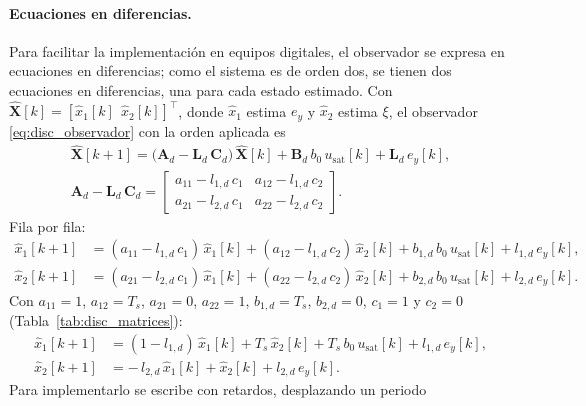 \paragraph{Ecuaciones en diferencias.} Para facilitar la implementación en equipos digitales, el
observador se expresa en ecuaciones en diferencias; como el sistema es de orden dos, se tienen dos
ecuaciones en diferencias, una para cada estado estimado. Con
$\widehat{\mathbf{X}}[k] = [\hat{x}_1[k]\ \ \hat{x}_2[k]]^{\top}$, donde
$\hat{x}_1$ estima $e_y$ y $\hat{x}_2$ estima $\xi$, el observador
\eqref{eq:disc_observador} con la orden aplicada es
\begin{equation}
\begin{gathered}
\widehat{\mathbf{X}}[k+1] = \bigl(\mathbf{A}_d - \mathbf{L}_d\,\mathbf{C}_d\bigr)\,\widehat{\mathbf{X}}[k]
+ \mathbf{B}_d\,b_0\,u_{\mathrm{sat}}[k] + \mathbf{L}_d\,e_y[k],
\\[6pt]
\mathbf{A}_d - \mathbf{L}_d\,\mathbf{C}_d =
\begin{bmatrix} a_{11} - l_{1,d}\,c_1 & a_{12} - l_{1,d}\,c_2 \\ a_{21} - l_{2,d}\,c_1 & a_{22} - l_{2,d}\,c_2 \end{bmatrix} .
\end{gathered}
\end{equation}
Fila por fila:
\begin{equation}
\begin{aligned}
\hat{x}_1[k+1] &= (a_{11} - l_{1,d}\,c_1)\,\hat{x}_1[k] + (a_{12} - l_{1,d}\,c_2)\,\hat{x}_2[k] + b_{1,d}\,b_0\,u_{\mathrm{sat}}[k] + l_{1,d}\,e_y[k], \\[2pt]
\hat{x}_2[k+1] &= (a_{21} - l_{2,d}\,c_1)\,\hat{x}_1[k] + (a_{22} - l_{2,d}\,c_2)\,\hat{x}_2[k] + b_{2,d}\,b_0\,u_{\mathrm{sat}}[k] + l_{2,d}\,e_y[k] .
\end{aligned}
\end{equation}
Con $a_{11} = 1$, $a_{12} = T_s$, $a_{21} = 0$, $a_{22} = 1$, $b_{1,d} = T_s$,
$b_{2,d} = 0$, $c_1 = 1$ y $c_2 = 0$ (Tabla~\ref{tab:disc_matrices}):
\begin{equation}
\begin{aligned}
\hat{x}_1[k+1] &= (1 - l_{1,d})\,\hat{x}_1[k] + T_s\,\hat{x}_2[k] + T_s\,b_0\,u_{\mathrm{sat}}[k] + l_{1,d}\,e_y[k], \\[2pt]
\hat{x}_2[k+1] &= -\,l_{2,d}\,\hat{x}_1[k] + \hat{x}_2[k] + l_{2,d}\,e_y[k] .
\end{aligned}
\label{eq:disc_filas}
\end{equation}
Para implementarlo se escribe con retardos, desplazando un periodo
